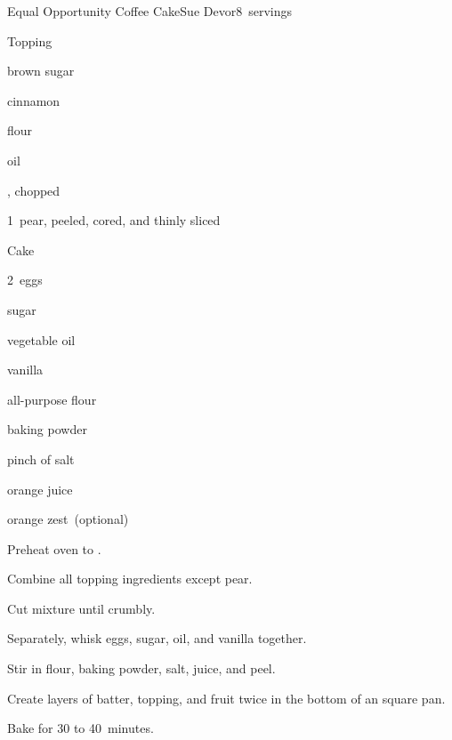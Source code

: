 \begin{recipe}{Equal Opportunity Coffee Cake}{Sue Devor}{8~servings}

Topping
\begin{ingredients}
\item \C{\half} brown sugar
\item {} cinnamon
\item {} flour
\item {} oil
\item {} , chopped
\item 1~pear, peeled, cored, and thinly sliced
\end{ingredients}

Cake
\begin{ingredients}
\item 2~eggs
\item {} sugar
\item \C{\half} vegetable oil
\item \tp{\half} vanilla
\item \C{1\half} all-purpose flour
\item {} baking powder
\item pinch of salt
\item \C{\half} orange juice
\item {} orange zest~(optional)
\end{ingredients}

\begin{directions}
\item Preheat oven to .
\item Combine all topping ingredients except pear.
\item Cut mixture until crumbly.
\item Separately, whisk eggs, sugar, oil, and vanilla together.
\item Stir in flour, baking powder, salt, juice, and peel.
\item Create layers of batter, topping, and fruit twice in the bottom of an  square pan.
\item Bake for 30 to 40~minutes.
\end{directions}

\end{recipe}
